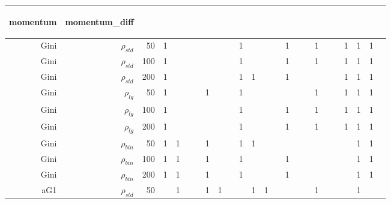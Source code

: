 \documentclass[twoside,11pt]{article}
\begin{document}
\begin{table}[htbp]
\begin{tabular}{rrr|rrrrrrrrrrrrrrrrrrrrr}
\begin{sideways}momentum\end{sideways} & \begin{sideways}momentum\_diff\end{sideways} \bigstrut[b]\\
    \hline
    Gini     & $\rho_{std}$ & 50    & 1     &       &       &       &       &       &       & 1     &       &       &       & 1     &       &       & 1     &       &       & 1     & 1     & 1     &  \bigstrut[t]\\
    Gini     & $\rho_{std}$ & 100   & 1     &       &       &       &       &       &       & 1     &       &       &       & 1     &       &       & 1     &       &       & 1     & 1     & 1     &  \\
    Gini     & $\rho_{std}$ & 200   & 1     &       &       &       &       &       &       & 1     & 1     &       &       & 1     &       &       &       &       &       & 1     & 1     & 1     &  \bigstrut[b]\\
    \hline
    Gini     & $\rho_{lg}$ & 50    & 1     &       &       &       & 1     &       &       & 1     &       &       &       &       &       &       & 1     &       &       & 1     & 1     & 1     &  \bigstrut[t]\\
    Gini     & $\rho_{lg}$ & 100   & 1     &       &       &       &       &       &       & 1     &       &       &       & 1     &       &       & 1     &       &       & 1     & 1     & 1     &  \\
    Gini     & $\rho_{lg}$ & 200   & 1     &       &       &       &       &       &       & 1     &       &       &       & 1     &       &       & 1     &       &       & 1     & 1     & 1     &  \bigstrut[b]\\
    \hline
    Gini     & $\rho_{bin}$ & 50    & 1     & 1     &       &       & 1     &       &       & 1     & 1     &       &       &       &       &       &       &       &       &       & 1     & 1     &  \bigstrut[t]\\
    Gini     & $\rho_{bin}$ & 100   & 1     & 1     &       &       & 1     &       &       & 1     &       &       &       & 1     &       &       &       &       &       &       & 1     & 1     &  \\
    Gini     & $\rho_{bin}$ & 200   & 1     & 1     &       &       & 1     &       &       & 1     &       &       &       & 1     &       &       &       &       &       &       & 1     & 1     &  \bigstrut[b]\\
    \hline
    aG1   & $\rho_{std}$ & 50    &       & 1     &       &       & 1     & 1     &       &       & 1     & 1     &       &       &       &       & 1     &       &       &       & 1     &       &  \bigstrut[t]\\

\end{tabular}
\end{table}
\end{document}
